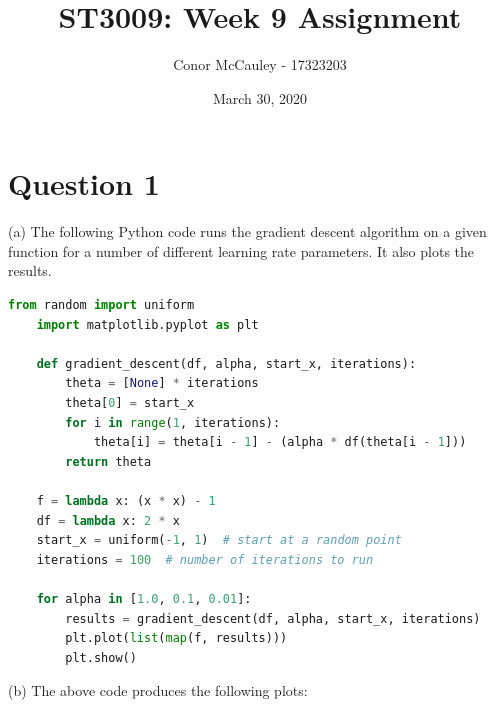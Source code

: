 \documentclass[12pt]{article}
\title{ST3009: Week 9 Assignment}
\author{Conor McCauley - 17323203}
\date{March 30, 2020}
\begin{document}
\maketitle

\section*{Question 1}

\noindent (a) The following Python code runs the gradient descent algorithm on a given function for a number of different learning rate parameters. It also plots the results.

\begin{lstlisting}[language=Python]
    from random import uniform
    import matplotlib.pyplot as plt
    
    def gradient_descent(df, alpha, start_x, iterations):
    	theta = [None] * iterations
    	theta[0] = start_x
    	for i in range(1, iterations):
    		theta[i] = theta[i - 1] - (alpha * df(theta[i - 1]))
    	return theta
    
    f = lambda x: (x * x) - 1
    df = lambda x: 2 * x
    start_x = uniform(-1, 1)  # start at a random point
    iterations = 100  # number of iterations to run
    
    for alpha in [1.0, 0.1, 0.01]:
    	results = gradient_descent(df, alpha, start_x, iterations)
    	plt.plot(list(map(f, results)))
    	plt.show()
\end{lstlisting}

\noindent (b) The above code produces the following plots:
\end{document}
